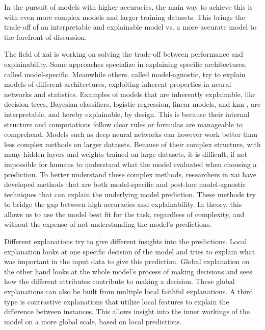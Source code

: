 In the pursuit of models with higher accuracies, the main way to achieve this is with even more complex models and larger training datasets\cite{bianchiniComplexityNeuralNetwork2014}. This brings the trade-off of an interpretable and explainable model vs. a more accurate model\cite{barredoarrietaExplainableArtificialIntelligence2020} to the forefront of discussion. 


The field of \gls{xai} is working on solving the trade-off between performance and explainability. Some approaches specialize in explaining specific architectures, called model-specific. Meanwhile others, called model-agnostic, try to explain models of different architectures, exploiting inherent properties in neural networks and statistics. Examples of models that are inherently explainable, like decision trees, Bayesian classifiers, logistic regression, linear models, and \gls{knn} \cite{fixDiscriminatoryAnalysisNonparametric1989, coverNearestNeighborPattern1967}, are interpretable, and hereby explainable, by design. This is because their internal structure and computations follow clear rules or formulas are manageable to comprehend.
Models such as deep neural networks can however work better than less complex methods on larger datasets. Because of their complex structure, with many hidden layers and weights trained on large datasets, it is difficult, if not impossible for humans to understand what the model evaluated when choosing a prediction. To better understand these complex methods, researchers in \gls{xai} have developed methods that are both model-specific and post-hoc model-agnostic techniques that can explain the underlying model prediction. These methods try to bridge the gap between high accuracies and explainability.
In theory, this allows us to use the model best fit for the task, regardless of complexity, and without the expense of not understanding the model's predictions. 

Different explanations try to give different insights into the predictions. Local explanation looks at one specific decision of the model and tries to explain what was important in the input data to give this prediction. Global explanation on the other hand looks at the whole model's process of making decisions and sees how the different attributes contribute to making a decision. These global explanations can also be built from multiple local faithful explanations. A third type is contrastive explanations that utilize local features to explain the difference between instances. This allows insight into the inner workings of the model on a more global scale, based on local predictions.

